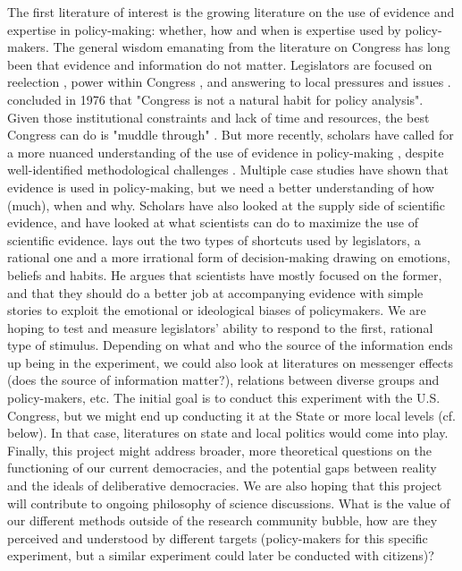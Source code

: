 \documentclass[12pt,final,fleqn]{article}
\theoremstyle{plain}
\begin{document}
The first literature of interest is the growing literature on the use of evidence and expertise in policy-making: whether, how and when is expertise used by policy-makers. The general wisdom emanating from the literature on Congress has long been that evidence and information do not matter. Legislators are focused on reelection \citep{mayhew1974congress}, power within Congress \citep{fenno1973congressmen}, and answering to local pressures and issues \citep{fenno2002home}.\citet{schick1976supply} concluded in 1976 that "Congress is not a natural habit for policy analysis". Given those institutional constraints and lack of time and resources, the best Congress can do is "muddle through" \citep{lindblom2018science}. But more recently, scholars have called for a more nuanced understanding of the use of evidence in policy-making \citet{patashnik2016can}, despite well-identified methodological challenges \citep{mandell1984approaches}. Multiple case studies have shown that evidence is used in policy-making, but we need a better understanding of how (much), when and why. Scholars have also looked at the supply side of scientific evidence, and have looked at what scientists can do to maximize the use of scientific evidence. \citet{cairney2016politics} lays out the two types of shortcuts used by legislators, a rational one and a more irrational form of decision-making drawing on emotions, beliefs and habits. He argues that scientists have mostly focused on the former, and that they should do a better job at accompanying evidence with simple stories to exploit the emotional or ideological biases of policymakers. We are hoping to test and measure legislators' ability to respond to the first, rational type of stimulus. 
\bigbreak
Depending on what and who the source of the information ends up being in the experiment, we could also look at literatures on messenger effects (does the source of information matter?), relations between diverse groups and policy-makers, etc. The initial goal is to conduct this experiment with the U.S. Congress, but we might end up conducting it at the State or more local levels (cf. below). In that case, literatures on state and local politics would come into play. Finally, this project might address broader, more theoretical questions on the functioning of our current democracies, and the potential gaps between reality and the ideals of deliberative democracies. We are also hoping that this project will contribute to ongoing philosophy of science discussions. What is the value of our different methods outside of the research community bubble, how are they perceived and understood by different targets (policy-makers for this specific experiment, but a similar experiment could later be conducted with citizens)? 
\end{document}
